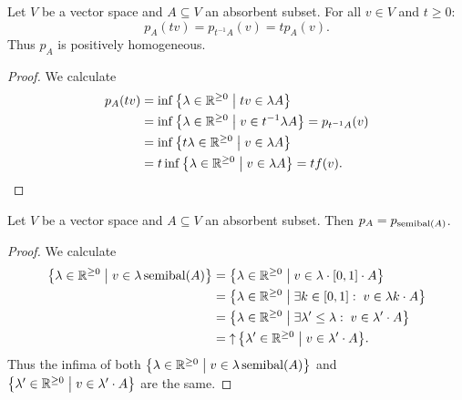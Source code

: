 \begin{lemma} \label{gaugeScaling}
Let $V$ be a vector space and $A\subseteq V$ an absorbent subset. For all $v\in V$ and $t\geq 0$:
\[ p_A(tv) = p_{t^{-1}A}(v) = t p_A(v). \]
Thus $p_A$ is positively homogeneous.
\end{lemma}
\begin{proof}
We calculate
\begin{align*}
p_A(tv) &= \inf\setbuilder{\lambda\in \R^{\geq 0}}{tv\in \lambda A} \\
&= \inf\setbuilder{\lambda\in \R^{\geq 0}}{v\in t^{-1}\lambda A} = p_{t^{-1}A}(v) \\
&= \inf\setbuilder{t\lambda\in \R^{\geq 0}}{v\in \lambda A} \\
&= t\inf\setbuilder{\lambda\in \R^{\geq 0}}{v\in \lambda A} = tf(v).
\end{align*}
\end{proof}

\begin{lemma} \label{semibalancedClosureGauge}
Let $V$ be a vector space and $A\subseteq V$ an absorbent subset. Then $p_A = p_{\operatorname{semibal}(A)}$.
\end{lemma}
\begin{proof}
We calculate
\begin{align*}
\setbuilder{\lambda\in\R^{\geq 0}}{v\in \lambda \semibalanced(A)} &= \setbuilder{\lambda\in\R^{\geq 0}}{v\in \lambda\cdot\interval{0,1}\cdot A} \\
&= \setbuilder{\lambda\in\R^{\geq 0}}{\exists k\in \interval{0,1}:\; v\in \lambda k\cdot A} \\
&= \setbuilder{\lambda\in\R^{\geq 0}}{\exists \lambda'\leq \lambda:\; v\in \lambda' \cdot A} \\
&= \upset \setbuilder{\lambda'\in\R^{\geq 0}}{v\in \lambda' \cdot A}.
\end{align*}
Thus the infima of both $\setbuilder{\lambda\in\R^{\geq 0}}{v\in \lambda \semibalanced(A)}$ and $\setbuilder{\lambda'\in\R^{\geq 0}}{v\in \lambda' \cdot A}$ are the same.
\end{proof}

